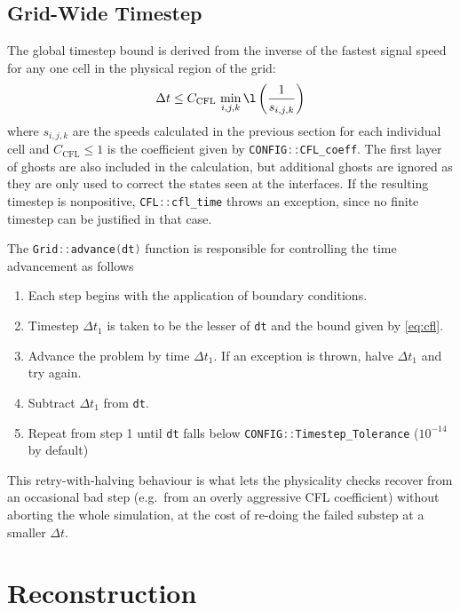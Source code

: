\documentclass[11pt]{report}
\newcommand{\cpp}[1]{\lstinline[language=C++]{#1}}
\begin{document}
\subsection{Grid-Wide Timestep}

The global timestep bound is derived from the inverse of the fastest signal speed for any one cell in the physical region of the grid:
\begin{equation} \label{eq:cfl}
\Delta t \leq C_\mathrm{CFL} \, \min_{i,j,k} \l \left(\frac{1}{s_{i,j,k}}\right)
\end{equation}
where $s_{i,j,k}$ are the speeds calculated in the previous section for each individual cell and $C_\mathrm{CFL} \le 1$ is the coefficient given by \cpp{CONFIG::CFL_coeff}.
The first layer of ghosts are also included in the calculation, but additional ghosts are ignored as they are only used to correct the states seen at the interfaces.  If the resulting timestep is nonpositive, \cpp{CFL::cfl_time} throws an exception, since no finite timestep can be justified in that case.


The \cpp{Grid::advance(dt)} function is responsible for controlling the time advancement as follows
\begin{enumerate}
\item Each step begins with the application of boundary conditions.
\item Timestep $\Delta t_1$ is taken to be the lesser of \cpp{dt} and the bound given by \ref{eq:cfl}.  
\item Advance the problem by time $\Delta t_1$. If an exception is thrown, halve $\Delta t_1$ and try again.%
\item Subtract $\Delta t_1$ from \cpp{dt}.
\item Repeat from step 1 until \cpp{dt} falls below \cpp{CONFIG::Timestep_Tolerance} ($10^{-14}$ by default)
\end{enumerate}

This retry-with-halving behaviour is what lets the physicality checks recover from an occasional bad step (e.g.\ from an overly aggressive CFL coefficient) without aborting the whole simulation, at the cost of re-doing the failed substep at a smaller $\Delta t$.
 
 



\section{Reconstruction}\label{sec:reconstruction}
\end{document}

